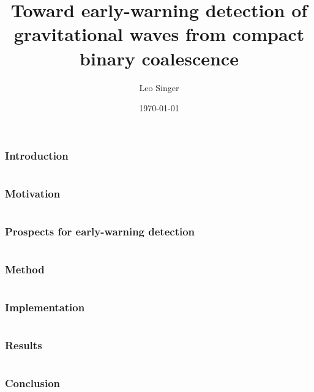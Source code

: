\documentclass{beamer}
\title[LIGO-Gxxxxxxx-vx]{Toward early-warning detection of gravitational waves from compact binary coalescence}
\institute[LIGO Caltech]{LIGO Laboratory, California Institute of Technology}
\author[L Singer]{Leo Singer}
\date{\today}
\begin{document}
\frame{\titlepage}


\begin{frame}
\frametitle{Introduction}
\end{frame}


\section[Outline]{}
\frame{\tableofcontents}


\section[Motivation]{}


\begin{frame}
\frametitle{Motivation}
\end{frame}


\section[Prospects for early-warning detection]{}


\begin{frame}
\frametitle{Prospects for early-warning detection}
\end{frame}


\section[Method]{}


\begin{frame}
\frametitle{Method}
\end{frame}


\section[Implementation]{}


\begin{frame}
\frametitle{Implementation}
\end{frame}


\section[Results]{}


\begin{frame}
\frametitle{Results}
\end{frame}


\section[Conclusion]{}


\begin{frame}
\frametitle{Conclusion}
\end{frame}
\end{document}
